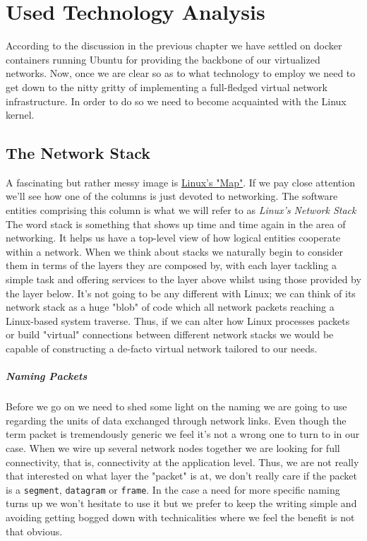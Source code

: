 \chapter{Used Technology Analysis}
    According to the discussion in the previous chapter we have settled on docker containers running Ubuntu for providing the backbone of our virtualized networks. Now, once we are clear so as to what technology to employ we need to get down to the nitty gritty of implementing a full-fledged virtual network infrastructure. In order to do so we need to become acquainted with the Linux kernel.

    \section{The Network Stack}
        A fascinating but rather messy image is \href{https://upload.wikimedia.org/wikipedia/commons/5/5b/Linux_kernel_map.png}{Linux's "Map"}. If we pay close attention we'll see how one of the columns is just devoted to networking. The software entities comprising this column is what we will refer to as \textit{Linux's Network Stack}\\

         The word stack is something that shows up time and time again in the area of networking. It helps us have a top-level view of how logical entities cooperate within a network. When we think about stacks we naturally begin to consider them in terms of the layers they are composed by, with each layer tackling a simple task and offering services to the layer above whilst using those provided by the layer below. It's not going to be any different with Linux; we can think of its network stack as a huge "blob" of code which all network packets reaching a Linux-based system traverse. Thus, if we can alter how Linux processes packets or build "virtual" connections between different network stacks we would be capable of constructing a de-facto virtual network tailored to our needs.\\

         \paragraph{Naming Packets}
            Before we go on we need to shed some light on the naming we are going to use regarding the units of data exchanged through network links. Even though the term packet is tremendously generic we feel it's not a wrong one to turn to in our case. When we wire up several network nodes together we are looking for full connectivity, that is, connectivity at the application level. Thus, we are not really that interested on what layer the "packet" is at, we don't really care if the packet is a \texttt{segment}, \texttt{datagram} or \texttt{frame}. In the case a need for more specific naming turns up we won't hesitate to use it but we prefer to keep the writing simple and avoiding getting bogged down with technicalities where we feel the benefit is not that obvious.

